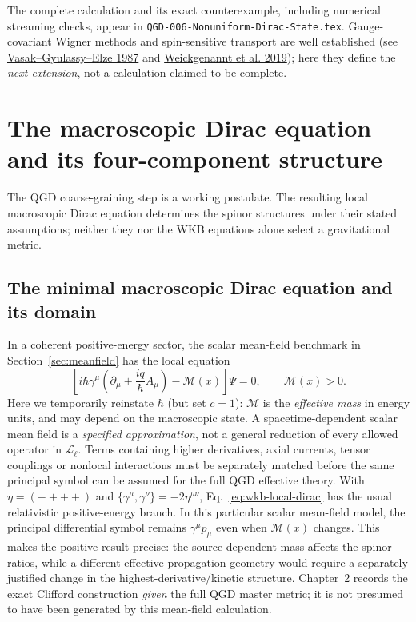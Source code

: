 \documentclass[11pt,a4paper]{article}
\newcommand{\Lagr}{\mathcal L}
\begin{document}
The complete calculation and its exact counterexample, including numerical streaming checks, appear in \texttt{QGD-006-Nonuniform-Dirac-State.tex}. Gauge-covariant Wigner methods and spin-sensitive transport are well established (see \href{https://doi.org/10.1016/0003-4916(87)90169-2}{Vasak--Gyulassy--Elze 1987} and \href{https://doi.org/10.1103/PhysRevD.100.056018}{Weickgenannt et al. 2019}); here they define the \emph{next extension}, not a calculation claimed to be complete.

\section{The macroscopic Dirac equation and its four-component structure}\label{sec:macro-origin}
The QGD coarse-graining step is a working postulate. The resulting local macroscopic Dirac equation determines the spinor structures under their stated assumptions; neither they nor the WKB equations alone select a gravitational metric.

\subsection{The minimal macroscopic Dirac equation and its domain}
In a coherent positive-energy sector, the scalar mean-field benchmark in Section~\ref{sec:meanfield} has the local equation
\begin{equation}\label{eq:wkb-local-dirac}
\left[i\hbar\gamma^\mu\left(\partial_\mu+\frac{iq}{\hbar}A_\mu\right)-\mathcal M(x)\right]\Psi=0,
\qquad \mathcal M(x)>0.
\end{equation}
Here we temporarily reinstate $\hbar$ (but set $c=1$): $\mathcal M$ is the \emph{effective mass} in energy units, and may depend on the macroscopic state.  A spacetime-dependent scalar mean field is a \emph{specified approximation}, not a general reduction of every allowed operator in $\Lagr_\ell$.  Terms containing higher derivatives, axial currents, tensor couplings or nonlocal interactions must be separately matched before the same principal symbol can be assumed for the full QGD effective theory.  With $\eta=(-+++)$ and $\{\gamma^\mu,\gamma^\nu\}=-2\eta^{\mu\nu}$, Eq.~\eqref{eq:wkb-local-dirac} has the usual relativistic positive-energy branch.  In this particular scalar mean-field model, the principal differential symbol remains $\gamma^\mu p_\mu$ even when $\mathcal M(x)$ changes.  This makes the positive result precise: the source-dependent mass affects the spinor ratios, while a different effective propagation geometry would require a separately justified change in the highest-derivative/kinetic structure.  Chapter~2 records the exact Clifford construction \emph{given} the full QGD master metric; it is not presumed to have been generated by this mean-field calculation.
\end{document}
